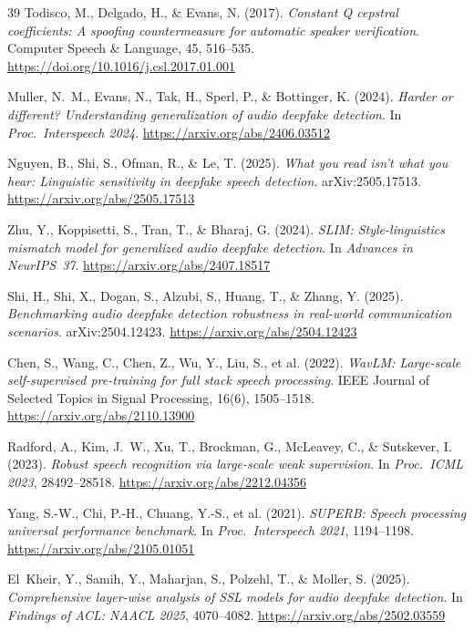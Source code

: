 \documentclass[11pt,a4paper]{article}
\begin{document}
\begin{thebibliography}{39}
Todisco, M., Delgado, H., \& Evans, N. (2017).
\textit{Constant Q cepstral coefficients: A spoofing countermeasure for
automatic speaker verification}.
Computer Speech \& Language, 45, 516--535.
\url{https://doi.org/10.1016/j.csl.2017.01.001}

Muller, N.~M., Evans, N., Tak, H., Sperl, P., \& Bottinger, K. (2024).
\textit{Harder or different? Understanding generalization of audio deepfake detection}.
In \textit{Proc.\ Interspeech 2024}.
\url{https://arxiv.org/abs/2406.03512}

Nguyen, B., Shi, S., Ofman, R., \& Le, T. (2025).
\textit{What you read isn't what you hear: Linguistic sensitivity in deepfake
speech detection}. arXiv:2505.17513.
\url{https://arxiv.org/abs/2505.17513}

Zhu, Y., Koppisetti, S., Tran, T., \& Bharaj, G. (2024).
\textit{SLIM: Style-linguistics mismatch model for generalized audio deepfake detection}.
In \textit{Advances in NeurIPS~37}.
\url{https://arxiv.org/abs/2407.18517}

Shi, H., Shi, X., Dogan, S., Alzubi, S., Huang, T., \& Zhang, Y. (2025).
\textit{Benchmarking audio deepfake detection robustness in real-world
communication scenarios}. arXiv:2504.12423.
\url{https://arxiv.org/abs/2504.12423}

Chen, S., Wang, C., Chen, Z., Wu, Y., Liu, S., et al. (2022).
\textit{WavLM: Large-scale self-supervised pre-training for full stack speech processing}.
IEEE Journal of Selected Topics in Signal Processing, 16(6), 1505--1518.
\url{https://arxiv.org/abs/2110.13900}

Radford, A., Kim, J.~W., Xu, T., Brockman, G., McLeavey, C., \& Sutskever, I. (2023).
\textit{Robust speech recognition via large-scale weak supervision}.
In \textit{Proc.\ ICML 2023}, 28492--28518.
\url{https://arxiv.org/abs/2212.04356}

Yang, S.-W., Chi, P.-H., Chuang, Y.-S., et al. (2021).
\textit{SUPERB: Speech processing universal performance benchmark}.
In \textit{Proc.\ Interspeech 2021}, 1194--1198.
\url{https://arxiv.org/abs/2105.01051}

El~Kheir, Y., Samih, Y., Maharjan, S., Polzehl, T., \& Moller, S. (2025).
\textit{Comprehensive layer-wise analysis of SSL models for audio deepfake detection}.
In \textit{Findings of ACL: NAACL 2025}, 4070--4082.
\url{https://arxiv.org/abs/2502.03559}


\end{thebibliography}
\end{document}
